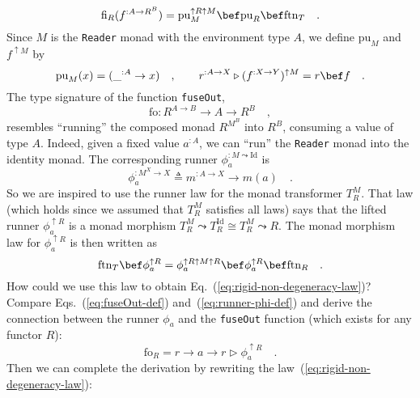 ~\vspace{-0.4\baselineskip}
\begin{equation}
\text{fi}_{R}(f^{:A\rightarrow R^{B}})=\text{pu}_{M}^{\uparrow R\uparrow M}\bef\text{pu}_{R}\bef\text{ftn}_{T}\quad.\label{eq:rigid-monad-fuseIn-def}
\end{equation}
Since $M$ is the \lstinline!Reader! monad with the environment type
$A$, we define $\text{pu}_{M}$ and $f^{\uparrow M}$ by
\[
\text{pu}_{M}(x)=(\_^{:A}\rightarrow x)\quad,\quad\quad r^{:A\rightarrow X}\triangleright(f^{:X\rightarrow Y})^{\uparrow M}=r\bef f\quad.
\]
The type signature of the function \lstinline!fuseOut!,
\[
\text{fo}:R^{A\rightarrow B}\rightarrow A\rightarrow R^{B}\quad,
\]
resembles \textsf{``}running\textsf{''} the composed monad $R^{M^{B}}$ into $R^{B}$,
consuming a value of type $A$. Indeed, given a fixed value $a^{:A}$,
we can \textsf{``}run\textsf{''} the \lstinline!Reader! monad into the identity monad.
The corresponding runner $\phi_{a}^{:M\leadsto\text{Id}}$ is
\begin{equation}
\phi_{a}^{:M^{X}\rightarrow X}\triangleq m^{:A\rightarrow X}\rightarrow m(a)\quad.\label{eq:runner-phi-def}
\end{equation}
So we are inspired to use the runner law for the monad transformer
$T_{R}^{M}$. That law (which holds since we assumed that $T_{R}^{M}$
satisfies all laws) says that the lifted runner $\phi_{a}^{\uparrow R}$
is a monad morphism $T_{R}^{M}\leadsto T_{R}^{\text{Id}}\cong T_{R}^{M}\leadsto R$.
The monad morphism law for $\phi_{a}^{\uparrow R}$ is then written
as
\begin{equation}
\text{ftn}_{T}\bef\phi_{a}^{\uparrow R}=\phi_{a}^{\uparrow R\uparrow M\uparrow R}\bef\phi_{a}^{\uparrow R}\bef\text{ftn}_{R}\quad.\label{eq:rigid-monad-is-rigid-functor-derivation1}
\end{equation}
How could we use this law to obtain Eq.~(\ref{eq:rigid-non-degeneracy-law})?
Compare Eqs.~(\ref{eq:fuseOut-def}) and~(\ref{eq:runner-phi-def})
and derive the connection between the runner $\phi_{a}$ and the \lstinline!fuseOut!
function (which exists for any functor $R$):
\[
\text{fo}_{R}=r\rightarrow a\rightarrow r\triangleright\phi_{a}^{\uparrow R}\quad.
\]
Then we can complete the derivation by rewriting the law~(\ref{eq:rigid-non-degeneracy-law}):
